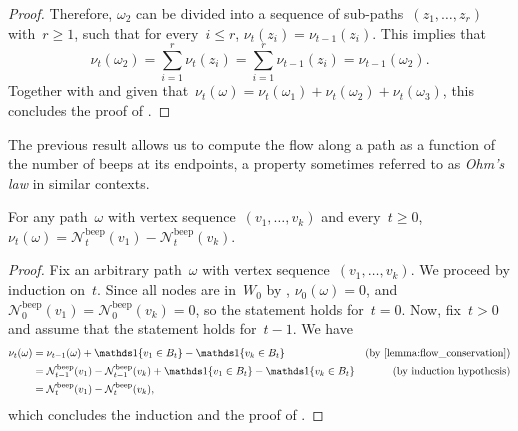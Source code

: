 \documentclass{article}
\newcommand{\inote}[1]{{\color{blue} ({\bf Isa:} #1)}}
\newcommand{\beepcount}{\mathcal{N}^{\mathrm{beep}}}
\begin{document}
\begin{proof}
    Therefore, $\omega_2$ can be divided into a sequence of sub-paths~$(z_1,\ldots,z_r)$ with~$r \geq 1$, such that for every~$i \leq r$, $\nu_t(z_i) = \nu_{t-1}(z_i)$. This implies that
    \begin{equation*}
        \nu_t(\omega_2) = \sum_{i=1}^r \nu_t(z_i) = \sum_{i=1}^r \nu_{t-1}(z_i) = \nu_{t-1}(\omega_2).
    \end{equation*}
    Together with  and given that~$\nu_t(\omega) = \nu_t(\omega_1) + \nu_t(\omega_2) + \nu_t(\omega_3)$, this concludes the proof of .
\end{proof}



The previous result allows us to compute the flow along a path as a function of the number of beeps at its endpoints, a property sometimes referred to as {\em Ohm’s law} in similar contexts.

\begin{corollary}  \label{cor:flow_path}
    For any path~$\omega$ with vertex sequence~$(v_1,\ldots,v_k)$ and every~$t \geq 0$, $\nu_t(\omega) = \beepcount_t(v_1) - \beepcount_t(v_k)$.
\end{corollary}
\begin{proof}
    Fix an arbitrary path~$\omega$ with vertex sequence~$(v_1,\ldots,v_k)$.
    We proceed by induction on~$t$.
    Since all nodes are in~$W_0$ by , $\nu_0(\omega) = 0$, and~$\beepcount_0(v_1) = \beepcount_0(v_k) = 0$, so the statement holds for~$t=0$.
    Now, fix~$t > 0$ and assume that the statement holds for~$t-1$. We have
    \begin{align*}
        \nu_{t}(\omega) &= \nu_{t-1}(\omega) + \bbOne\{v_1 \in B_t\} - \bbOne\{v_k \in B_t\} & \text{(by \Cref{lemma:flow_conservation})} \\
        &= \beepcount_{t-1}(v_1) - \beepcount_{t-1}(v_k) + \bbOne\{v_1 \in B_t\} - \bbOne\{v_k \in B_t\} & \text{(by induction hypothesis)} \\
        &= \beepcount_{t}(v_1) - \beepcount_{t}(v_k),
    \end{align*}
    which concludes the induction and the proof of .
\end{proof}
\end{document}

